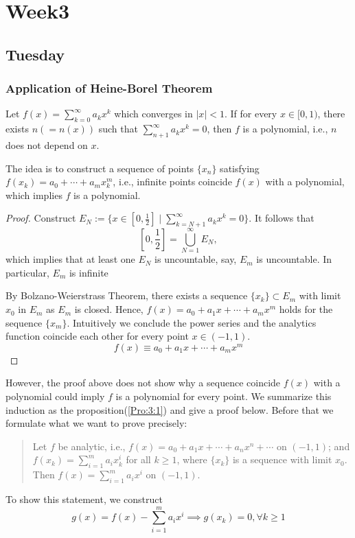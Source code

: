 \chapter{Week3}

\section{Tuesday}
\subsection{Application of Heine-Borel Theorem}
\begin{theorem}
Let $f(x)=\sum_{k=0}^\infty a_kx^k$ which converges in $|x|<1$. If for every $x\in[0,1)$, there exists $n (=n(x))$ such that $\sum_{n+1}^\infty a_kx^k=0$, then $f$ is a polynomial, i.e., $n$ does not depend on $x$.
\end{theorem}
The idea is to construct a sequence of points $\{x_n\}$ satisfying $f(x_k) = a_0+\cdots+a_mx_k^m$, i.e., infinite points coincide $f(x)$ with a polynomial, which implies $f$ is a polynomial.
\begin{proof}
Construct $E_N:=\{x\in[0,\frac{1}{2}]\mid \sum_{k=N+1}^\infty a_kx^k=0\}$. It follows that
\[
[0,\frac{1}{2}] = \bigcup_{N=1}^\infty E_N,
\]
which implies that at least one $E_N$ is uncountable, say, $E_m$ is uncountable. In particular, $E_m$ is infinite

By Bolzano-Weierstrass Theorem, there exists a sequence $\{x_k\}\subset E_m$ with limit $x_0$ in $E_m$ as $E_m$ is closed. Hence, $f(x)=a_0+a_1x+\cdots+a_mx^m$ holds for the sequence $\{x_m\}$. Intuitively we conclude the power series and the analytics function coincide each other for every point $x\in(-1,1)$.
\[
f(x)\equiv a_0+a_1x+\cdots+a_mx^m
\]

\end{proof}
However, the proof above does not show why a sequence coincide $f(x)$ with a polynomial could imply $f$ is a polynomial for every point. We summarize this induction as the proposition(\ref{Pro:3:1}) and give a proof below. Before that we formulate what we want to prove precisely:
\begin{quotation}
Let $f$ be analytic, i.e., $f(x) = a_0+a_1x+\cdots+a_nx^n+\cdots$ on $(-1,1)$; and $f(x_k)=\sum_{i=1}^ma_ix_k^i$ for all $k\ge1$, where $\{x_k\}$ is a sequence with limit $x_0$. Then $f(x) = \sum_{i=1}^ma_ix^i$ on $(-1,1)$.
\end{quotation}
To show this statement, we construct
\[
g(x) = f(x) - \sum_{i=1}^ma_ix^i\implies g(x_k)=0,\forall k\ge1
\]
